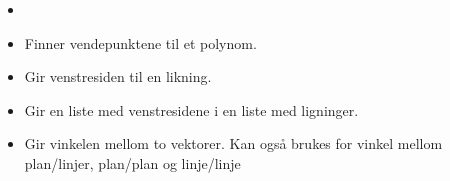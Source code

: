 \begin{itemize}
\item {}

\item {}
{Finner vendepunktene til et polynom.}

\item {}
{Gir venstresiden til en likning.}

\item {}
{Gir en liste med venstresidene i en liste med ligninger.}

\item {}
{Gir vinkelen mellom to vektorer. Kan også brukes for vinkel mellom plan/linjer, plan/plan og linje/linje}
\end{itemize}










\regsin

\retn

\skalar



\summ



\trikomb

\vektor

\vekpro

\vend

